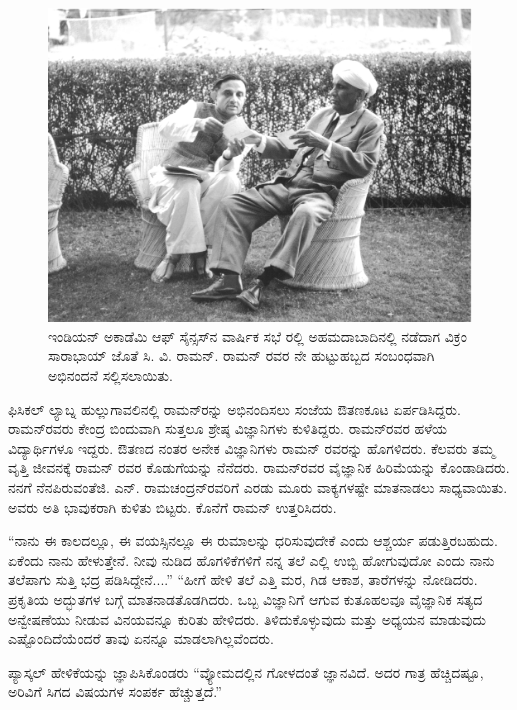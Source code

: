 \begin{figure}[!t]
\includegraphics[scale=0.22]{"images/11.jpg"}
\caption{ಇಂಡಿಯನ್ ಅಕಾಡೆಮಿ ಆಫ್ ಸೈನ್ಸಸ್‍ನ ವಾರ್ಷಿಕ ಸಭೆ ರಲ್ಲಿ ಅಹಮದಾಬಾದಿನಲ್ಲಿ ನಡೆದಾಗ ವಿಕ್ರಂ ಸಾರಾಭಾಯ್ ಜೊತೆ ಸಿ. ವಿ. ರಾಮನ್. ರಾಮನ್ ರವರ ನೇ ಹುಟ್ಟುಹಬ್ಬದ ಸಂಬಂಧವಾಗಿ ಅಭಿನಂದನೆ ಸಲ್ಲಿಸಲಾಯಿತು.}\label{chap2-fig02}
\end{figure}

ಫಿಸಿಕಲ್ ಲ್ಯಾಬ್ನ ಹುಲ್ಲುಗಾವಲಿನಲ್ಲಿ ರಾಮನ್‍ರನ್ನು ಅಭಿನಂದಿಸಲು ಸಂಜೆಯ ಔತಣಕೂಟ ಏರ್ಪಡಿಸಿದ್ದರು. ರಾಮನ್‍ರವರು ಕೇಂದ್ರ ಬಿಂದುವಾಗಿ ಸುತ್ತಲೂ ಶ್ರೇಷ್ಠ ವಿಜ್ಞಾನಿಗಳು ಕುಳಿತಿದ್ದರು. ರಾಮನ್‍ರವರ ಹಳೆಯ ವಿದ್ಯಾರ್ಥಿಗಳೂ ಇದ್ದರು. ಔತಣದ ನಂತರ ಅನೇಕ ವಿಜ್ಞಾನಿಗಳು ರಾಮನ್ ರವರನ್ನು ಹೊಗಳಿದರು. ಕೆಲವರು ತಮ್ಮ ವೃತ್ತಿ ಜೀವನಕ್ಕೆ ರಾಮನ್ ರವರ ಕೊಡುಗೆಯನ್ನು ನೆನೆದರು. ರಾಮನ್‍ರವರ ವೈಜ್ಞಾನಿಕ ಹಿರಿಮೆಯನ್ನು ಕೊಂಡಾಡಿದರು. ನನಗೆ ನೆನಪಿರುವಂತೆ\break ಜಿ. ಎನ್. ರಾಮಚಂದ್ರನ್‍ರವರಿಗೆ ಎರಡು ಮೂರು ವಾಕ್ಯಗಳಷ್ಟೇ ಮಾತನಾಡಲು ಸಾಧ್ಯವಾಯಿತು. ಅವರು ಅತಿ ಭಾವುಕರಾಗಿ ಕುಳಿತು ಬಿಟ್ಟರು. ಕೊನೆಗೆ ರಾಮನ್ ಉತ್ತರಿಸಿದರು.

 “ನಾನು ಈ ಕಾಲದಲ್ಲೂ, ಈ ವಯಸ್ಸಿನಲ್ಲೂ ಈ ರುಮಾಲನ್ನು ಧರಿಸುವುದೇಕೆ ಎಂದು ಆಶ್ಚರ್ಯ ಪಡುತ್ತಿರಬಹುದು. ಏಕೆಂದು ನಾನು ಹೇಳುತ್ತೇನೆ. ನೀವು ನುಡಿದ ಹೊಗಳಿಕೆಗಳಿಗೆ ನನ್ನ ತಲೆ ಎಲ್ಲಿ ಉಬ್ಬಿ ಹೋಗುವುದೋ ಎಂದು ನಾನು ತಲೆಪಾಗು ಸುತ್ತಿ ಭದ್ರ ಪಡಿಸಿದ್ದೇನೆ....” “ಹೀಗೆ ಹೇಳಿ ತಲೆ ಎತ್ತಿ ಮರ, ಗಿಡ ಆಕಾಶ, ತಾರೆಗಳನ್ನು ನೋಡಿದರು. ಪ್ರಕೃತಿಯ ಅದ್ಭುತಗಳ ಬಗ್ಗೆ ಮಾತನಾಡತೊಡಗಿದರು. ಒಬ್ಬ ವಿಜ್ಞಾನಿಗೆ ಆಗುವ ಕುತೂಹಲವೂ ವೈಜ್ಞಾನಿಕ ಸತ್ಯದ ಅನ್ವೇಷಣೆಯು ನೀಡುವ ವಿನಯವನ್ನೂ ಕುರಿತು ಹೇಳಿದರು. ತಿಳಿದುಕೊಳ್ಳುವುದು ಮತ್ತು ಅಧ್ಯಯನ ಮಾಡುವುದು ಎಷ್ಟೊಂದಿದೆಯೆಂದರೆ ತಾವು ಏನನ್ನೂ ಮಾಡಲಾಗಿಲ್ಲವೆಂದರು. 

ಪ್ಯಾಸ್ಕಲ್ ಹೇಳಿಕೆಯನ್ನು ಜ್ಞಾಪಿಸಿಕೊಂಡರು “ವ್ಯೋಮದಲ್ಲಿನ ಗೋಳದಂತೆ ಜ್ಞಾನವಿದೆ. ಅದರ ಗಾತ್ರ ಹೆಚ್ಚಿದಷ್ಟೂ, ಅರಿವಿಗೆ ಸಿಗದ ವಿಷಯಗಳ ಸಂಪರ್ಕ ಹೆಚ್ಚುತ್ತದೆ.”

